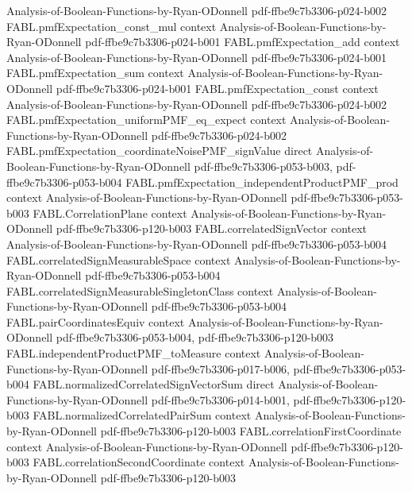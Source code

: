 \begin{theorem}
  {Analysis-of-Boolean-Functions-by-Ryan-ODonnell}
  {pdf-ffbe9c7b3306-p024-b002}
\proofstep
  {FABL.pmfExpectation_const_mul}
  {context}
  {Analysis-of-Boolean-Functions-by-Ryan-ODonnell}
  {pdf-ffbe9c7b3306-p024-b001}
\proofstep
  {FABL.pmfExpectation_add}
  {context}
  {Analysis-of-Boolean-Functions-by-Ryan-ODonnell}
  {pdf-ffbe9c7b3306-p024-b001}
\proofstep
  {FABL.pmfExpectation_sum}
  {context}
  {Analysis-of-Boolean-Functions-by-Ryan-ODonnell}
  {pdf-ffbe9c7b3306-p024-b001}
\proofstep
  {FABL.pmfExpectation_const}
  {context}
  {Analysis-of-Boolean-Functions-by-Ryan-ODonnell}
  {pdf-ffbe9c7b3306-p024-b002}
\proofstep
  {FABL.pmfExpectation_uniformPMF_eq_expect}
  {context}
  {Analysis-of-Boolean-Functions-by-Ryan-ODonnell}
  {pdf-ffbe9c7b3306-p024-b002}
\proofstep
  {FABL.pmfExpectation_coordinateNoisePMF_signValue}
  {direct}
  {Analysis-of-Boolean-Functions-by-Ryan-ODonnell}
  {pdf-ffbe9c7b3306-p053-b003,
    pdf-ffbe9c7b3306-p053-b004}
\proofstep
  {FABL.pmfExpectation_independentProductPMF_prod}
  {context}
  {Analysis-of-Boolean-Functions-by-Ryan-ODonnell}
  {pdf-ffbe9c7b3306-p053-b003}
\proofstep
  {FABL.CorrelationPlane}
  {context}
  {Analysis-of-Boolean-Functions-by-Ryan-ODonnell}
  {pdf-ffbe9c7b3306-p120-b003}
\proofstep
  {FABL.correlatedSignVector}
  {context}
  {Analysis-of-Boolean-Functions-by-Ryan-ODonnell}
  {pdf-ffbe9c7b3306-p053-b004}
\proofstep
  {FABL.correlatedSignMeasurableSpace}
  {context}
  {Analysis-of-Boolean-Functions-by-Ryan-ODonnell}
  {pdf-ffbe9c7b3306-p053-b004}
\proofstep
  {FABL.correlatedSignMeasurableSingletonClass}
  {context}
  {Analysis-of-Boolean-Functions-by-Ryan-ODonnell}
  {pdf-ffbe9c7b3306-p053-b004}
\proofstep
  {FABL.pairCoordinatesEquiv}
  {context}
  {Analysis-of-Boolean-Functions-by-Ryan-ODonnell}
  {pdf-ffbe9c7b3306-p053-b004,
    pdf-ffbe9c7b3306-p120-b003}
\proofstep
  {FABL.independentProductPMF_toMeasure}
  {context}
  {Analysis-of-Boolean-Functions-by-Ryan-ODonnell}
  {pdf-ffbe9c7b3306-p017-b006,
    pdf-ffbe9c7b3306-p053-b004}
\proofstep
  {FABL.normalizedCorrelatedSignVectorSum}
  {direct}
  {Analysis-of-Boolean-Functions-by-Ryan-ODonnell}
  {pdf-ffbe9c7b3306-p014-b001,
    pdf-ffbe9c7b3306-p120-b003}
\proofstep
  {FABL.normalizedCorrelatedPairSum}
  {context}
  {Analysis-of-Boolean-Functions-by-Ryan-ODonnell}
  {pdf-ffbe9c7b3306-p120-b003}
\proofstep
  {FABL.correlationFirstCoordinate}
  {context}
  {Analysis-of-Boolean-Functions-by-Ryan-ODonnell}
  {pdf-ffbe9c7b3306-p120-b003}
\proofstep
  {FABL.correlationSecondCoordinate}
  {context}
  {Analysis-of-Boolean-Functions-by-Ryan-ODonnell}
  {pdf-ffbe9c7b3306-p120-b003}

\end{theorem}
